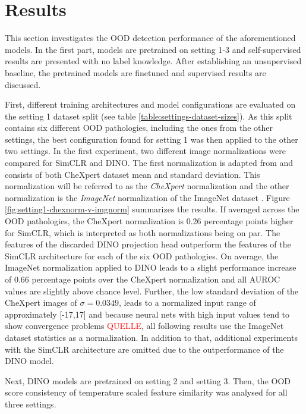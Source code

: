 \section{Results}
This section investigates the OOD detection performance of the aforementioned models.
In the first part, models are pretrained on setting 1-3 and self-supervised results are presented with no label knowledge.
After establishing an unsupervised baseline, the pretrained models are finetuned and supervised results are discussed.
\par
First, different training architectures and model configurations are evaluated on the setting 1 dataset split (see table \ref{table:settings-dataset-sizes}).
As this split contains six different OOD pathologies, including the ones from the other settings, the best configuration found for setting 1 was then applied to the other two settings.
In the first experiment, two different image normalizations were compared for SimCLR and DINO.
The first normalization is adapted from \citep{Berger2021} and consists of both CheXpert dataset mean and standard deviation.
This normalization will be referred to as the \textit{CheXpert} normalization and the other normalization is the \textit{ImageNet} normalization of the ImageNet dataset \citep{Deng2009}.
Figure \ref{fig:setting1-chexnorm-v-imgnorm} summarizes the results.
If averaged across the OOD pathologies, the CheXpert normalization is 0.26 percentage points higher for SimCLR, which is interpreted as both normalizations being on par.
The features of the discarded DINO projection head outperform the features of the SimCLR architecture for each of the six OOD pathologies.
On average, the ImageNet normalization applied to DINO leads to a slight performance increase of 0.66 percentage points over the CheXpert normalization and all AUROC values are slightly above chance level.
Further, the low standard deviation of the CheXpert images of $\sigma=0.0349$, leads to a normalized input range of approximately [-17,17] and because neural nets with high input values tend to show convergence problems \textcolor{red}{QUELLE}, all following results use the ImageNet dataset statistics as a normalization.
In addition to that, additional experiments with the SimCLR architecture are omitted due to the outperformance of the DINO model.
\par
{}
Next, DINO models are pretrained on setting 2 and setting 3.
Then, the OOD score consistency of temperature scaled feature similarity was analysed for all three settings.
